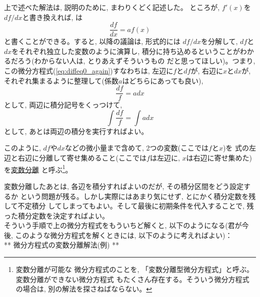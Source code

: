 上で述べた解法は, 説明のために, まわりくどく記述した。
ところが, $f'(x)$を$df/dx$と書き換えれば, は
\begin{equation}\frac{df}{dx}=a f(x)\label{eq:difex3dfdx}\end{equation}
と書くことができる。すると, 以降の議論は, 形式的には
$df/dx$を分解して, $df$と$dx$をそれぞれ独立した変数のように演算し, 
積分に持ち込めるということがわかるだろう(わからない人は, とりあえずそういうもの
だと思ってほしい)。つまり, この微分方程式(\ref{eq:diffeq0_again})すなわちは, 
左辺に$f$と$df$が, 右辺に$x$と$dx$が, それぞれ集まるように整理して(係数$a$はどちらにあっても良い), 
\begin{equation}\frac{df}{f}=a dx\end{equation}
として, 両辺に積分記号をくっつけて, 
\begin{equation}\int\frac {df}{f} = \int a dx\end{equation}
として, あとは両辺の積分を実行すればよい。

このように, $df$や$dx$などの微小量まで含めて, 2つの変数(ここでは$f$と$x$)を
式の左辺と右辺に分離して寄せ集めること(ここでは$f$は左辺に, $x$は右辺に寄せ集めた)
を\underline{変数分離} と呼ぶ\footnote{変数分離が可能な
微分方程式のことを, 「変数分離型微分方程式」と呼ぶ。変数分離ができない微分方程式
もたくさん存在する。そういう微分方程式の場合は, 別の解法を探さねばならない。}。

変数分離したあとは, 各辺を積分すればよいのだが, その積分区間をどう設定するか
という問題が残る。しかし実際にはあまり気にせず, とにかく積分定数を残して不定積分
してしまってもよい。そして最後に初期条件を代入することで, 残った積分定数を決定すればよい。\\

そういう手順で上の微分方程式をもういちど解くと, 以下のようになる(君が今後, 
このような微分方程式を解くときには, 以下のように考えればよい)：\\

** 微分方程式の変数分離解法(例) **

